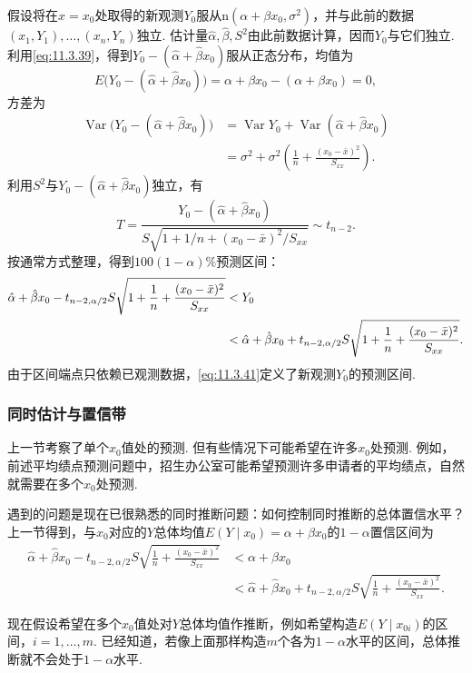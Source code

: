 假设将在$x=x_0$处取得的新观测$Y_0$服从$\mathrm n(\alpha+\beta x_0,\sigma^2)$，并与此前的数据$(x_1,Y_1),\allowbreak\ldots,\allowbreak(x_n,Y_n)$独立. 估计量$\hat\alpha,\hat\beta,S^2$由此前数据计算，因而$Y_0$与它们独立. 利用\eqref{eq:11.3.39}，得到$Y_0-(\hat\alpha+\hat\beta x_0)$服从正态分布，均值为
$$E\bigl(Y_0-(\hat\alpha+\hat\beta x_0)\bigr)=\alpha+\beta x_0-(\alpha+\beta x_0)=0,$$
方差为
\begin{align*}
\operatorname{Var}\bigl(Y_0-(\hat\alpha+\hat\beta x_0)\bigr)
&=\operatorname{Var}Y_0+\operatorname{Var}(\hat\alpha+\hat\beta x_0)\\
&=\sigma^2+\sigma^2\left(\frac1n+\frac{(x_0-\bar x)^2}{S_{xx}}\right).
\end{align*}
利用$S^2$与$Y_0-(\hat\alpha+\hat\beta x_0)$独立，有
$$T=\frac{Y_0-(\hat\alpha+\hat\beta x_0)}{S\sqrt{1+1/n+(x_0-\bar x)^2/S_{xx}}}\sim t_{n-2}.$$
按通常方式整理，得到$100(1-\alpha)\%$预测区间：
\begin{equation}\label{eq:11.3.41}\index{SI0902@预测区间}
\begin{aligned}
\hat\alpha+\hat\beta x_0-t_{n-2,\alpha/2}S\sqrt{1+\frac1n+\frac{(x_0-\bar x)^2}{S_{xx}}}
&<Y_0\\
&<\hat\alpha+\hat\beta x_0+t_{n-2,\alpha/2}S\sqrt{1+\frac1n+\frac{(x_0-\bar x)^2}{S_{xx}}}.
\end{aligned}
\end{equation}
由于区间端点只依赖已观测数据，\eqref{eq:11.3.41}定义了新观测$Y_0$的预测区间.

\subsubsection{同时估计与置信带}\label{sec:11.3.6}
上一节考察了单个$x_0$值处的预测. 但有些情况下可能希望在许多$x_0$处预测. 例如，前述平均绩点预测问题中，招生办公室可能希望预测许多申请者的平均绩点，自然就需要在多个$x_0$处预测.

遇到的问题是现在已很熟悉的同时推断问题：如何控制同时推断的总体置信水平？上一节得到，与$x_0$对应的$Y$总体均值$E(Y\mid x_0)=\alpha+\beta x_0$的$1-\alpha$置信区间为
$$\begin{aligned}
\hat\alpha+\hat\beta x_0-t_{n-2,\alpha/2}S\sqrt{\frac1n+\frac{(x_0-\bar x)^2}{S_{xx}}}
&<\alpha+\beta x_0\\
&<\hat\alpha+\hat\beta x_0+t_{n-2,\alpha/2}S\sqrt{\frac1n+\frac{(x_0-\bar x)^2}{S_{xx}}}.
\end{aligned}$$

现在假设希望在多个$x_0$值处对$Y$总体均值作推断，例如希望构造$E(Y\mid x_{0i})$的区间，$i=1,\ldots,m$. 已经知道，若像上面那样构造$m$个各为$1-\alpha$水平的区间，总体推断就不会处于$1-\alpha$水平.

